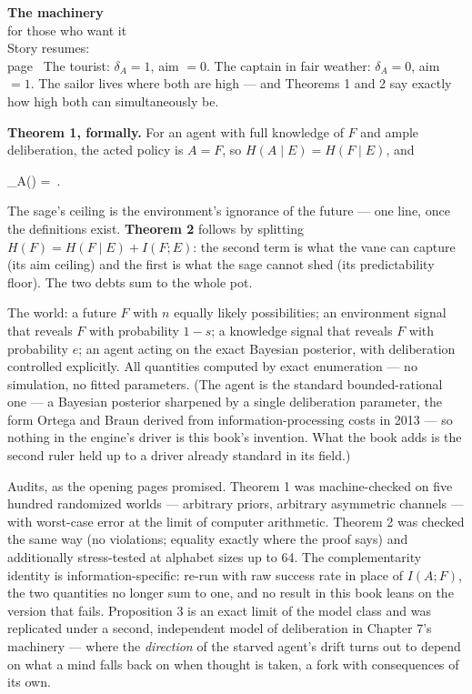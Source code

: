 \begin{machinery}{\textbf{The machinery}\\for those who want it\\[3pt]{\color{muted}Story resumes:\\page~\pageref{ch5}}}
\noindent The tourist: \(\delta_A = 1\), aim \(= 0\). The captain in fair weather: \(\delta_A = 0\), aim \(= 1\). The sailor lives where both are high --- and Theorems 1 and 2
say exactly how high both can simultaneously be.


\textbf{Theorem 1, formally.} For an agent with full knowledge of \(F\) and ample deliberation, the acted policy is \(A = F\), so \(H(A \mid E) = H(F \mid E)\), and

\begin{dispmath}\delta_A() = \,.\end{dispmath}

\noindent The sage's ceiling is the environment's ignorance of the future --- one
line, once the definitions exist. \textbf{Theorem 2} follows by splitting
\(H(F) = H(F \mid E) \allowbreak + I(F;E)\): the second term is what the vane can capture
(its aim ceiling) and the first is what the sage cannot shed (its
predictability floor). The two debts sum to the whole pot.


The world: a future \(F\) with \(n\) equally likely possibilities; an environment signal that reveals \(F\) with probability \(1-s\); a knowledge signal that reveals \(F\) with probability \(e\); an agent acting on the exact
Bayesian posterior, with deliberation controlled explicitly. All
quantities computed by exact enumeration --- no simulation, no fitted
parameters. (The agent is the standard bounded-rational one --- a Bayesian posterior sharpened by a single deliberation parameter, the form Ortega and Braun derived from information-processing costs in 2013 --- so nothing in the engine's driver is this book's invention. What the book adds is the second ruler held up to a driver already standard in its field.)

Audits, as the opening pages promised. Theorem 1 was machine-checked on five
hundred randomized worlds --- arbitrary priors, arbitrary asymmetric
channels --- with worst-case error at the limit of computer arithmetic.
Theorem 2 was checked the same way (no violations; equality exactly
where the proof says) and additionally stress-tested at alphabet sizes
up to 64. The complementarity identity is information-specific: re-run
with raw success rate in place of \(I(A;F)\), the two quantities no longer
sum to one, and no result in this book leans on the version that fails.
Proposition 3 is an exact limit of the model class and was replicated
under a second, independent model of deliberation in Chapter 7's
machinery --- where the \emph{direction} of the starved agent's drift turns out
to depend on what a mind falls back on when thought is taken, a fork
with consequences of its own.

\end{machinery}

